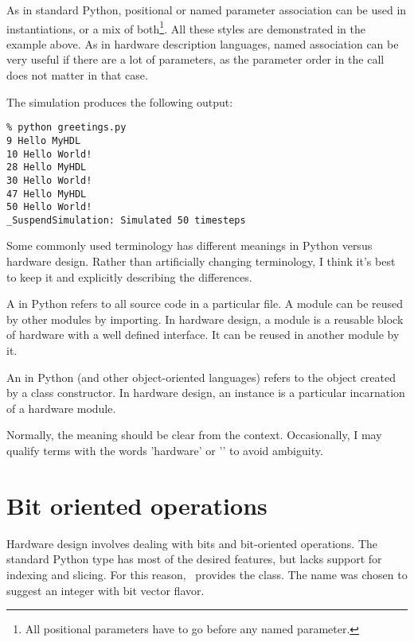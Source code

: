 As in standard Python, positional or named parameter association can
be used in instantiations, or a mix of both\footnote{All positional
parameters have to go before any named parameter.}. All these styles
are demonstrated in the example above. As in hardware description
languages, named association can be very useful if there are a lot of
parameters, as the parameter order in the call does not matter in that
case.

The simulation produces the following output:

\begin{verbatim}
% python greetings.py
9 Hello MyHDL
10 Hello World!
28 Hello MyHDL
30 Hello World!
47 Hello MyHDL
50 Hello World!
_SuspendSimulation: Simulated 50 timesteps
\end{verbatim}


\begin{notice}[warning]
Some commonly used terminology has different meanings
in Python versus hardware design. Rather than artificially
changing terminology, I think it's best to keep it
and explicitly describing the differences.

A  in Python refers to all source code
in a particular file. A module can be reused by
other modules by importing. In hardware design,
%
a module is  a reusable block of hardware with
a well defined interface. It can be reused in 
another module by  it.

An  in Python (and other object-oriented
languages) refers to the object created by a
%
class constructor. In hardware design, an instance
is a particular incarnation of a hardware module.

Normally, the meaning should be clear from
the context. Occasionally, I may qualify terms 
with the words 'hardware' or '\myhdl{}' to 
avoid ambiguity.
\end{notice}


\section{Bit oriented operations \label{intro-bit}}

Hardware design involves dealing with bits and bit-oriented
operations. The standard Python type  has most of the
desired features, but lacks support for indexing and slicing. For this
reason, \myhdl\ provides the  class. The name was chosen
to suggest an integer with bit vector flavor.

